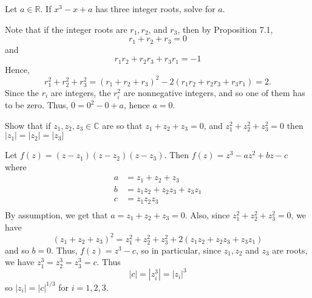 \documentclass[11pt,dvipsnames]{book}
\def\C{{\mathbb{C}}}
\numberwithin{equation}{section} %
\numberwithin{figure}{section} %
\numberwithin{table}{section} %
\begin{document}
\begin{exercise} 
 Let $a\in \mathbb{R}$. If $x^{3}-x+a$ has three integer roots, solve for $a$. 

\begin{solution}


Note that if the integer roots are $r_{1},r_{2}$, and $r_{3}$, then by Proposition 7.1,
\[
r_{1}+r_{2}+r_{3}=0\]
and 
\[
r_{1}r_{2}+r_{2}r_{3}+r_{3}r_{1}=-1
\]
Hence,
\[
r_{1}^{2}+r_{2}^{2}+r_{3}^{2} = (r_{1}+r_{2}+r_{3})^{2}-2(r_{1}r_{2}+r_{2}r_{3}+r_{3}r_{1})=2.
\]
Since the $r_{i}$ are integers, the $r_{i}^{2}$ are nonnegative integers, and so one of them has to be zero. Thus, $0=0^{2}-0+a$, hence $a=0$. 

\end{solution}


\end{exercise}





\begin{exercise} Show that if $z_1,z_2,z_3\in \C$ are so that $z_1+z_2+z_3=0$, and $z_1^2+z_2^2+z_3^2=0$ then $|z_1|=|z_2|=|z_3|$


\begin{solution}
Let $f(z)=(z-z_1)(z-z_2)(z-z_3)$. Then $f(z)=z^3-az^2+bz-c$ where 
\begin{align*}
a&=z_1+z_2+z_3\\[4pt]
b&=z_1z_2+z_2z_3+z_3z_1\\[4pt]
c&=z_1z_2z_3\\[4pt]
\end{align*}
By assumption, we get that $a=z_1+z_2+z_3=0$.  Also, since $z_{1}^2+z_{2}^2+z_{3}^2=0$, we have 
\[
(z_1+z_2+z_3)^2=z_1^2+z_2^2+z_3^2+2(z_1z_2+z_2z_3+z_3z_1)
\]
and so $b=0$. Thus, $f(z)=z^3-c$, so in particular, since $z_{1},z_{2}$ and $z_{3}$ are roots, we have $z_{1}^3=z_{2}^3=z_{3}^{3}=c$. Thus
\[
|c|=|z_{i}^3|=|z_{i}|^3
\]
so $|z_{i}|=|c|^{1/3}$ for $i=1,2,3$. 
\end{solution}

\end{exercise}

%
%
%
%
\end{document}
